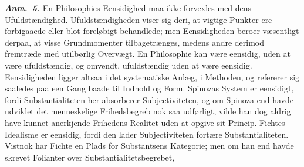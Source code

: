 \documentclass[12pt]{book}
\newcommand{\anm}[1]{\emph{\textbf{Anm.~#1.}}}
\newcommand{\opage}[1]{\marginnote{\footnotesize\textit{[#1]}}}
\begin{document}
\anm{5} En Philosophies Eensidighed maa ikke forvexles med dens Ufuldstændighed.
Ufuldstændigheden viser sig deri, at vigtige Punkter ere forbigaaede eller blot
foreløbigt behandlede; men Eensidigheden beroer væsentligt derpaa, at visse
Grundmomenter tilbagetrænges, medens andre derimod fremtræde med utilbørlig
Overvægt. En Philosophie kan være eensidig, uden at være ufuldstændig, og omvendt,
ufuldstændig uden at være eensidig. Eensidigheden ligger altsaa i det systematiske
Anlæg, i Methoden, og refererer sig saaledes paa een Gang baade til Indhold og Form.
Spinozas System er eensidigt, fordi Substantialiteten her absorberer Subjectiviteten,
og om Spinoza end havde udviklet det menneskelige Frihedsbegreb nok saa udførligt,
vilde han dog aldrig have kunnet anerkjende Frihedens Realitet uden at opgive sit
Princip. Fichtes Idealisme er eensidig, fordi den lader Subjectiviteten fortære
Substantialiteten. Vistnok har Fichte en Plads for Substantsens Kategorie; men om han
end havde skrevet Folianter over Substantialitetsbegrebet,
\opage{96} %
%
\end{document}
